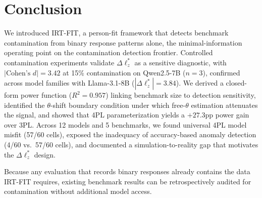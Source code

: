 \section{Conclusion}\label{sec:conclusion}

We introduced \textsc{IRT-FIT}, a person-fit framework that detects benchmark contamination from binary response patterns alone, the minimal-information operating point on the contamination detection frontier.
Controlled contamination experiments validate $\Delta\ell_z^*$ as a sensitive diagnostic, with $|\text{Cohen's } d| = 3.42$ at 15\% contamination on Qwen2.5-7B ($n{=}3$), confirmed across model families with Llama-3.1-8B ($|\Delta\ell_z^*| = 3.84$).
We derived a closed-form power function ($R^2 = 0.957$) linking benchmark size to detection sensitivity, identified the $\theta$-shift boundary condition under which free-$\theta$ estimation attenuates the signal, and showed that 4PL parameterization yields a $+27.3$pp power gain over 3PL.
Across 12 models and 5 benchmarks, we found universal 4PL model misfit (57/60 cells), exposed the inadequacy of accuracy-based anomaly detection (4/60 vs.\ 57/60 cells), and documented a simulation-to-reality gap that motivates the $\Delta\ell_z^*$ design.

Because any evaluation that records binary responses already contains the data \textsc{IRT-FIT} requires, existing benchmark results can be retrospectively audited for contamination without additional model access.